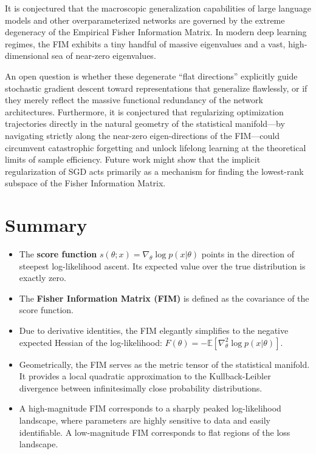 \begin{horizon}
It is conjectured that the macroscopic generalization capabilities of large language models and other overparameterized networks are governed by the extreme degeneracy of the Empirical Fisher Information Matrix. In modern deep learning regimes, the FIM exhibits a tiny handful of massive eigenvalues and a vast, high-dimensional sea of near-zero eigenvalues. 

An open question is whether these degenerate ``flat directions'' explicitly guide stochastic gradient descent toward representations that generalize flawlessly, or if they merely reflect the massive functional redundancy of the network architectures. Furthermore, it is conjectured that regularizing optimization trajectories directly in the natural geometry of the statistical manifold---by navigating strictly along the near-zero eigen-directions of the FIM---could circumvent catastrophic forgetting and unlock lifelong learning at the theoretical limits of sample efficiency. Future work might show that the implicit regularization of SGD acts primarily as a mechanism for finding the lowest-rank subspace of the Fisher Information Matrix.
\end{horizon}

\section{Summary}

\begin{itemize}
    \item The \textbf{score function} $s(\theta; x) = \nabla_\theta \log p(x|\theta)$ points in the direction of steepest log-likelihood ascent. Its expected value over the true distribution is exactly zero.
    \item The \textbf{Fisher Information Matrix (FIM)} is defined as the covariance of the score function.
    \item Due to derivative identities, the FIM elegantly simplifies to the negative expected Hessian of the log-likelihood: $F(\theta) = - \mathbb{E}[ \nabla_\theta^2 \log p(x|\theta) ]$.
    \item Geometrically, the FIM serves as the metric tensor of the statistical manifold. It provides a local quadratic approximation to the Kullback-Leibler divergence between infinitesimally close probability distributions.
    \item A high-magnitude FIM corresponds to a sharply peaked log-likelihood landscape, where parameters are highly sensitive to data and easily identifiable. A low-magnitude FIM corresponds to flat regions of the loss landscape.
\end{itemize}

